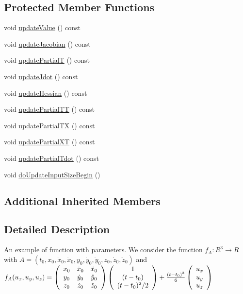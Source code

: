 \subsection*{Protected Member Functions}
\begin{DoxyCompactItemize}
\item 
void \hyperlink{classFunction3_a61a81957c58f90042f8df6e10974d6ef}{update\+Value} () const
\item 
void \hyperlink{classFunction3_a6e94cc5951344e5a44f830d7040100b1}{update\+Jacobian} () const
\item 
void \hyperlink{classFunction3_a6592fadecc793ba578475ed791c657e7}{update\+PartialT} () const
\item 
void \hyperlink{classFunction3_a416607e3c9ac711bf693b1dbf57e7b8b}{update\+Jdot} () const
\item 
void \hyperlink{classFunction3_a9255f1b3b5e85def42c228a6dec43317}{update\+Hessian} () const
\item 
void \hyperlink{classFunction3_a0e88a8fab26e4eb4fd30e6dd27c5a1b2}{update\+Partial\+TT} () const
\item 
void \hyperlink{classFunction3_a9e969d761e7694eef0c5695cb198f0cd}{update\+Partial\+TX} () const
\item 
void \hyperlink{classFunction3_ac363f9786af5a5bf700943b558ecbe92}{update\+Partial\+XT} () const
\item 
void \hyperlink{classFunction3_af8933a1d41481c599995d64519a69a33}{update\+Partial\+Tdot} () const
\item 
void \hyperlink{classFunction3_a00a1ea6f2a0fdc5df66004e23038fff0}{do\+Update\+Input\+Size\+Begin} ()
\end{DoxyCompactItemize}
\subsection*{Additional Inherited Members}


\subsection{Detailed Description}
An example of function with parameters. We consider the function $ f_A:R^3 \rightarrow R $ with $ A = \left(t_0, x_0, \dot{x}_0, \ddot{x}_0, y_0, \dot{y}_0, \ddot{y}_0, z_0, \dot{z}_0, \ddot{z}_0 \right) $ and $ f_A(u_x,u_y,u_z) = \left(\begin{array}{c c c} x_0 & \dot{x}_0 & \ddot{x}_0 \\ y_0 & \dot{y}_0 & \ddot{y}_0 \\ z_0 & \dot{z}_0 & \ddot{z}_0 \end{array}\right) \left(\begin{array}{c} 1 \\ (t-t_0) \\ (t-t_0)^2/2 \end{array}\right) + \frac{(t-t_0)^3}{6} \left(\begin{array}{c} u_x \\ u_y \\ u_z \end{array}\right) $ 

